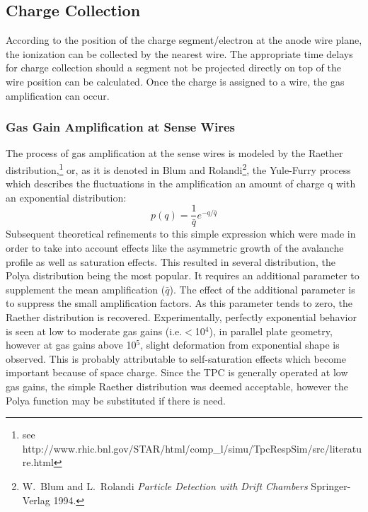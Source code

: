 \documentclass[twoside]{article}
\begin{document}
\subsection{Charge Collection}

According to the position of the charge segment/electron at the
anode wire plane, the ionization can be collected by the nearest wire.
The appropriate time delays for charge collection should a segment not
be projected directly on top of the wire position can be calculated.
Once the charge is assigned to a wire, the gas amplification can occur.

\subsubsection{Gas Gain Amplification at Sense Wires}

The process of gas amplification at the sense wires is modeled
by the Raether distribution,\footnote{see http://www.rhic.bnl.gov/STAR/html/comp\_l/simu/TpcRespSim/src/literature.html}
or, as it is denoted in Blum and Rolandi\footnote{W.~Blum and L.~Rolandi
  {\em Particle Detection with Drift Chambers} Springer-Verlag 1994.},
the Yule-Furry process which
describes the fluctuations in the amplification an amount of
charge q with an exponential distribution:
\begin{equation}
          p(q) = \frac{1}{\bar{q}} e^{-q/\bar{q}}
\label{eq:raether}
\end{equation}
Subsequent theoretical refinements to this simple expression which
were made in order to take into account effects like
the asymmetric growth of the avalanche profile as well as saturation
effects.  This resulted in several distribution, the Polya distribution
being the most popular.  It requires an additional parameter to supplement
the mean amplification ($\bar{q}$).  The effect of the additional parameter
is to suppress the small amplification factors.
As this parameter tends to zero, the Raether distribution is recovered.
Experimentally, perfectly exponential behavior is seen at
low to moderate gas gains (i.e.$<$10$^{4}$), in parallel plate geometry,
however at gas gains above 10$^{5}$, slight deformation from
exponential shape is observed.  This is probably
attributable to self-saturation effects which
become important because of space charge.  Since the TPC is generally
operated at low gas gains, the simple Raether distribution was
deemed acceptable, however the Polya function may be substituted
if there is need.
\end{document}
